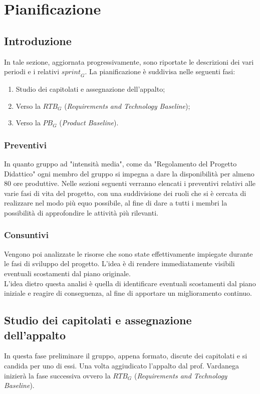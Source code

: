 \section{Pianificazione}
\subsection{Introduzione}
In tale sezione, aggiornata progressivamente, sono riportate le descrizioni dei vari periodi e i relativi $\textit{sprint}_G$.
La pianificazione è suddivisa nelle seguenti fasi:
\begin{enumerate}
    \item Studio dei capitolati e assegnazione dell'appalto;
    \item Verso la $\textit{RTB}_G$ (\emph{Requirements and Technology Baseline});
    \item Verso la $\textit{PB}_G$ (\emph{Product Baseline}).
\end{enumerate}
\subsubsection{Preventivi}
In quanto gruppo ad "intensità media", come da "Regolamento del Progetto Didattico" ogni membro del gruppo si impegna a dare la disponibilità per almeno 80 ore produttive. Nelle sezioni seguenti verranno elencati i preventivi relativi alle varie fasi di vita del progetto, con una suddivisione dei ruoli che si è cercata di realizzare nel modo più equo possibile, al fine di dare a tutti i membri la possibilità di approfondire le attività più rilevanti.  
\subsubsection{Consuntivi}
Vengono poi analizzate le risorse che sono state effettivamente impiegate durante le fasi di sviluppo del progetto. L'idea è di rendere immediatamente visibili eventuali scostamenti dal piano originale. \\
L'idea dietro questa analisi è quella di identificare eventuali scostamenti dal piano iniziale e reagire di conseguenza, al fine di apportare un miglioramento continuo. 

\subsection{Studio dei capitolati e assegnazione dell'appalto}
In questa fase preliminare il gruppo, appena formato, discute dei capitolati e si candida per uno di essi. Una volta aggiudicato l'appalto dal prof. Vardanega inizierà la fase successiva ovvero la $\textit{RTB}_G$ (\emph{Requirements and Technology Baseline}).

